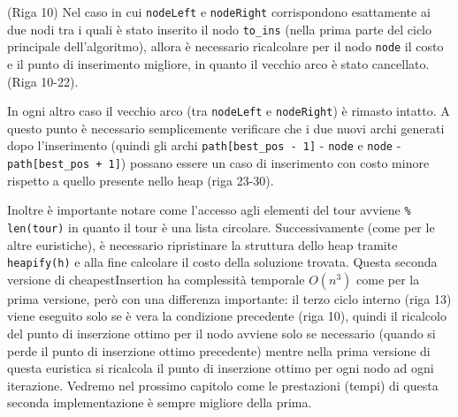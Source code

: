 \documentclass[a4paper,12pt]{report}
\begin{document}
\begin{legal}
  \item (Riga 10) Nel caso in cui \lstinline!nodeLeft! e \lstinline!nodeRight! corrispondono esattamente ai due nodi tra i quali è stato inserito il nodo \lstinline!to_ins! (nella prima parte del ciclo principale dell'algoritmo), allora è necessario ricalcolare per il nodo \lstinline!node! il costo e il punto di inserimento migliore, in quanto il vecchio arco è stato cancellato. (Riga 10-22).
  \item In ogni altro caso il vecchio arco (tra \lstinline!nodeLeft! e \lstinline!nodeRight!) è rimasto intatto. A questo punto è necessario semplicemente verificare che i due nuovi archi generati dopo l'inserimento (quindi gli archi \lstinline!path[best_pos - 1]! - \lstinline!node! e \lstinline!node! - \lstinline!path[best_pos + 1]!) possano essere un caso di inserimento con costo minore rispetto a quello presente nello heap (riga 23-30).
\end{legal}
Inoltre è importante notare come l'accesso agli elementi del tour avviene \lstinline!% len(tour)! in quanto il tour è una lista circolare.
Successivamente (come per le altre euristiche), è necessario ripristinare la struttura dello heap tramite \lstinline!heapify(h)! e alla fine calcolare il costo della soluzione trovata. \newline
Questa seconda versione di cheapestInsertion ha complessità temporale $O(n^3)$ come per la prima versione, però con una differenza importante: il terzo ciclo interno (riga 13) viene eseguito solo se è vera la condizione precedente (riga 10), quindi il ricalcolo del punto di inserzione ottimo per il nodo avviene solo se necessario (quando si perde il punto di inserzione ottimo precedente) mentre nella prima versione di questa euristica si ricalcola il punto di inserzione ottimo per ogni nodo ad ogni iterazione. Vedremo nel prossimo capitolo come le prestazioni (tempi) di questa seconda implementazione è sempre migliore della prima.
\end{document}
